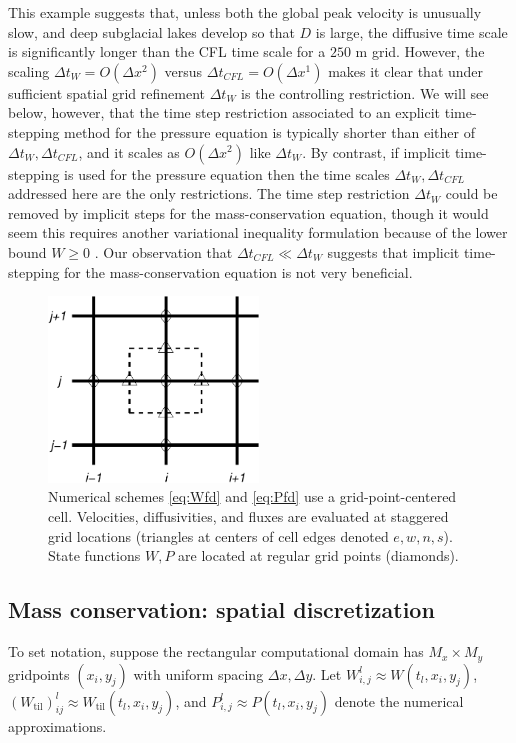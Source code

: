 \documentclass[gmd]{copernicus}   %
\newcommand{\text}{\textrm}
\newcommand{\Wtil}{W_{\text{til}}}
\newcommand{\Wlij}{W^l_{i,j}}
\newcommand{\Plij}{P^l_{i,j}}
\begin{document}
This example suggests that, unless both the global peak velocity is unusually slow, and deep subglacial lakes develop so that $D$ is large, the diffusive time scale is significantly longer than the CFL time scale for a $250$ m grid.  However, the scaling $\Delta t_W = O(\Delta x^2)$ versus $\Delta t_{CFL} = O(\Delta x^1)$ makes it clear that under sufficient spatial grid refinement $\Delta t_W$ is the controlling restriction.  We will see below, however, that the time step restriction associated to an explicit time-stepping method for the pressure equation is typically shorter than either of $\Delta t_W,\Delta t_{CFL}$, and it scales as $O(\Delta x^2)$ like $\Delta t_W$.  By contrast, if implicit time-stepping is used for the pressure equation \citep{Hewittetal2012,Schoofetal2012} then the time scales $\Delta t_W, \Delta t_{CFL}$ addressed here are the only restrictions.  The time step restriction $\Delta t_W$ could be removed by implicit steps for the mass-conservation equation, though it would seem this requires another variational inequality formulation because of the lower bound $W\ge 0$ \citep[compare][]{JouvetBueler2012}.  Our observation that $\Delta t_{CFL} \ll \Delta t_W$ suggests that implicit time-stepping for the mass-conservation equation is not very beneficial.

\begin{figure}[ht]
\centering
\includegraphics[width=2.2in,keepaspectratio=true]{diffstencil}
\bigskip
\caption{Numerical schemes \eqref{eq:Wfd} and \eqref{eq:Pfd} use a grid-point-centered cell.  Velocities, diffusivities, and fluxes are evaluated at staggered grid locations (triangles at centers of cell edges denoted $e,w,n,s$).  State functions $W,P$ are located at regular grid points (diamonds).}
\label{fig:stencil}
\end{figure}

\subsection{Mass conservation: spatial discretization}  To set notation, suppose the rectangular computational domain has $M_x \times M_y$ gridpoints $(x_i,y_j)$ with uniform spacing $\Delta x,\Delta y$.  Let $\Wlij \approx W(t_l,x_i,y_j)$, $(\Wtil)_{ij}^l \approx \Wtil(t_l,x_i,y_j)$, and $\Plij \approx P(t_l,x_i,y_j)$ denote the numerical approximations.
\end{document}
